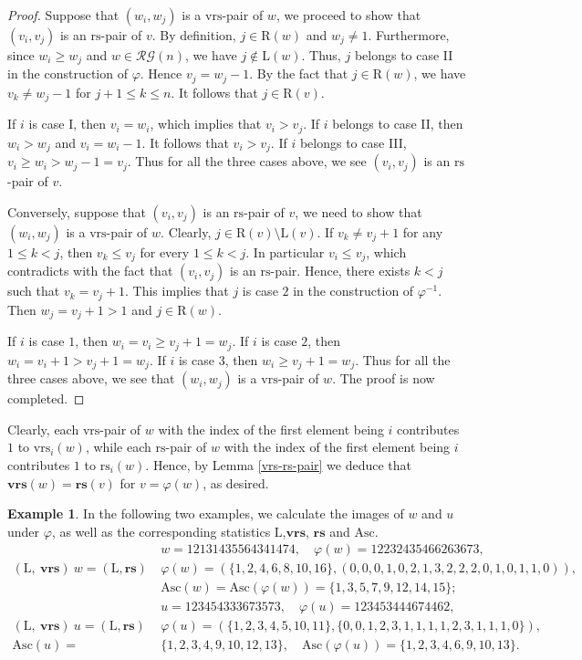 \documentclass[12pt]{amsart}
\numberwithin{equation}{section}
\theoremstyle{plain}
\theoremstyle{definition}
\newtheorem{example}[theorem]{Example}
\def\rs{\mathrm{rs}}
\def\wrs{\mathrm{vrs}}
\def\Asc{\mathrm{Asc}}
\def\LL{\mathrm{L}}
\def\RR{\mathrm{R}}
\def\brs{\mathbf{rs}}
\def\bwrs{\mathbf{vrs}}
\def\RG{\mathcal{RG}}
\begin{document}
\begin{proof}
  Suppose that $(w_i, w_j)$ is a $\wrs$-pair of $w$, we proceed to show that $(v_i , v_j)$ is an $\rs$-pair of $v$.
  By definition, $j \in \RR(w)$ and $w_j \neq 1$. Furthermore,  since $w_i \geq w_j$ and $w\in\RG(n)$, we have $j \notin \LL(w)$. Thus, $j$
  belongs to case II in the construction of $\varphi$.
  Hence $v_j=w_j-1$.
  By the fact that $j \in \RR(w)$, we have $v_k \neq w_j -1$
 for  $j+1 \leq k \leq n$. It follows that $j \in \RR(v)$.

    If $i$ is case I, then $v_i=w_i$, which implies that $v_i>v_j$. If $i$ belongs to case II, then
    $w_i> w_j$ and $v_i=w_i-1$. It follows that
    $v_i >v_j$. If $i$ belongs to case III, $v_i \geq w_i > w_j-1=v_j$.
    Thus for all  the three cases above, we see $(v_i , v_j)$ is an
    $\rs$-pair of $v$.

    Conversely, suppose that $(v_i,v_j)$ is an $\rs$-pair of $v$, we need to
    show that $(w_i,w_j)$ is a $\wrs$-pair of $w$. Clearly, $j \in \RR(v)\setminus\LL(v)$. If  $v_k \neq v_j +1$ for any $1 \leq k <j$, then $v_k \le v_j$ for every $1 \leq k <j$. In particular $v_i \leq v_j$, which contradicts with the fact that $(v_i,v_j)$ is an $\rs$-pair.
    Hence, there exists $k <j $ such that $v_k=v_j+1$. This implies that $j$ is case $2$ in the construction of $\varphi^{-1}$.
    Then $w_j=v_j+1> 1$ and $j\in \RR(w)$.

    If $i$ is case $1$, then
    $w_i=v_i\geq v_j+1=w_j$. If $i$ is case $2$, then
    $w_i=v_i+1> v_j+1=w_j$. If $i$ is case $3$, then
    $w_i \geq v_j+1=w_j$. Thus for all the three cases above, we
    see that $(w_i,w_j)$ is a $\wrs$-pair of $w$. The proof is now completed.
\end{proof}

Clearly, each $\wrs$-pair of $w$  with the index of the first element being $i$ contributes $1$ to
$\wrs_i(w)$, while each $\rs$-pair of $w$  with the index of the first element being $i$ contributes $1$ to
$\rs_i(w)$. Hence, by Lemma \ref{vrs-rs-pair} we deduce that
$\bwrs(w)=\brs(v)$ for $v=\varphi(w)$, as desired.


\begin{example}
In the following two examples, we calculate the images of $w$ and $u$ under $\varphi$,
as well as the corresponding statistics $\LL$,$\bwrs$, $\brs$ and $\Asc$.
\begin{align*}
&w= 12131435564341474, \quad  \varphi(w) = 12232435466263673,\\
(\LL,\: \bwrs)\:w =(\LL, \brs)\:&\varphi(w)=(\{1,2,4,6,8,10,16\},(0,0,0,1,0,2,1,3,2,2,2,0,1,0,1,1,0)),\\
&\Asc(w) = \Asc(\varphi(w))=\{1,3,5,7,9,12,14,15\};\\
&u = 123454333673573, \quad \varphi(u) = 123453444674462,\\
(\LL,\:  \bwrs)\:u =(\LL, \brs)\:&\varphi(u)=(\{1,2,3,4,5,10,11\},\{0,0,1,2,3,1,1,1,1,2,3,1,1,1,0\}),\\
\Asc(u)=&\{1,2,3,4,9,10,12,13\}, \quad \Asc(\varphi(u))=\{1,2,3,4,6,9,10,13\}.
\end{align*}
\end{example}
\end{document}

